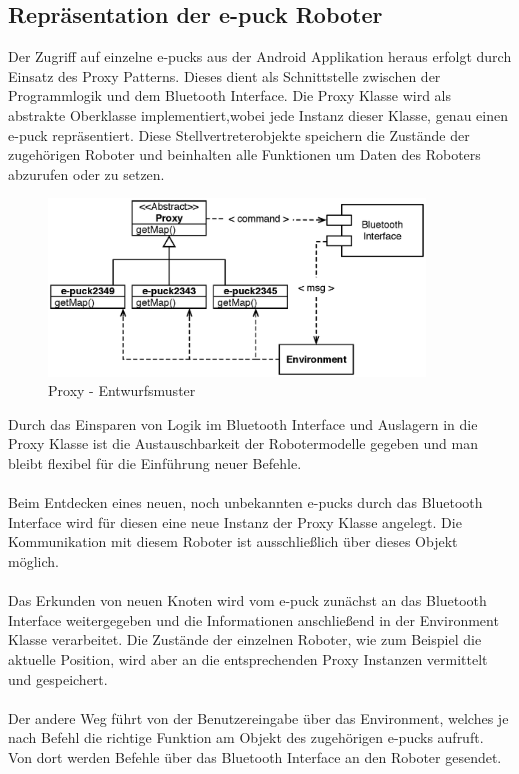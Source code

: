 \documentclass[10pt,a4paper]{article}
\begin{document}
  		\subsection{Repräsentation der e-puck Roboter}
  			Der Zugriff auf einzelne e-pucks aus der Android Applikation heraus erfolgt durch Einsatz des Proxy Patterns. Dieses dient als Schnittstelle
  			zwischen der Programmlogik und dem Bluetooth Interface. Die Proxy Klasse wird als abstrakte Oberklasse implementiert,wobei jede Instanz
  			dieser Klasse, genau einen e-puck repräsentiert. Diese Stellvertreterobjekte speichern die Zustände der zugehörigen Roboter und beinhalten
  			alle Funktionen um Daten des Roboters abzurufen oder zu setzen.
			\begin{figure}[h]
				\centering
				\includegraphics[width=10cm]{images/android_proxy.eps}
  				\caption{Proxy - Entwurfsmuster}
  			\end{figure}	
  			Durch das Einsparen von Logik im Bluetooth Interface und Auslagern in die Proxy Klasse ist die Austauschbarkeit der Robotermodelle gegeben
  			und man bleibt flexibel für die Einführung neuer Befehle. \\ \\
  			Beim Entdecken eines neuen, noch unbekannten e-pucks durch das Bluetooth Interface wird für diesen eine neue Instanz der Proxy Klasse
  			angelegt. Die Kommunikation mit diesem Roboter ist ausschließlich über dieses Objekt möglich.\\ \\
  			Das Erkunden von neuen Knoten wird vom e-puck zunächst an das Bluetooth Interface weitergegeben und die Informationen anschließend
  			in der Environment Klasse verarbeitet. Die Zustände der einzelnen Roboter, wie zum Beispiel die aktuelle Position, wird aber an die
  			entsprechenden Proxy Instanzen vermittelt und gespeichert.\\ \\
  			Der andere Weg führt von der Benutzereingabe über das Environment, welches je nach Befehl die richtige Funktion am Objekt des zugehörigen
  			e-pucks aufruft. Von dort werden Befehle über das Bluetooth Interface an den Roboter gesendet.
\end{document}
